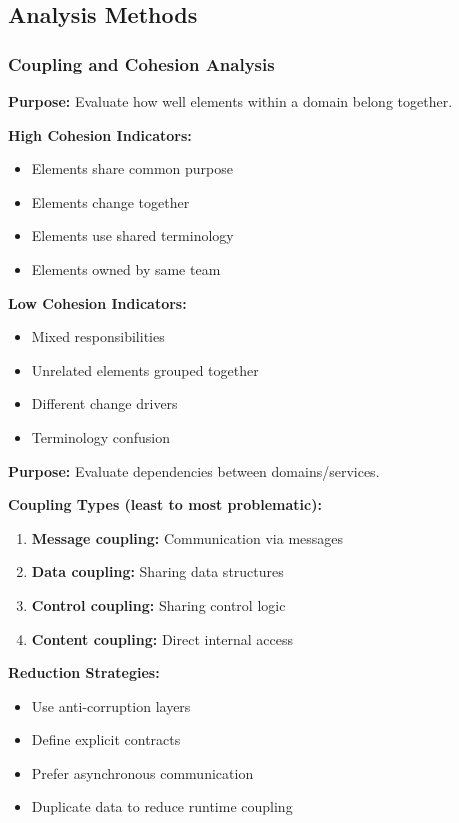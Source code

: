 \documentclass[11pt,letterpaper]{article}
\begin{document}
\subsection{Analysis Methods}

\subsubsection{Coupling and Cohesion Analysis}

\begin{definitionbox}
\textbf{Purpose:} Evaluate how well elements within a domain belong together.

\textbf{High Cohesion Indicators:}
\begin{itemize}[nosep]
    \item Elements share common purpose
    \item Elements change together
    \item Elements use shared terminology
    \item Elements owned by same team
\end{itemize}

\textbf{Low Cohesion Indicators:}
\begin{itemize}[nosep]
    \item Mixed responsibilities
    \item Unrelated elements grouped together
    \item Different change drivers
    \item Terminology confusion
\end{itemize}
\end{definitionbox}

\begin{definitionbox}
\textbf{Purpose:} Evaluate dependencies between domains/services.

\textbf{Coupling Types (least to most problematic):}
\begin{enumerate}[nosep]
    \item \textbf{Message coupling:} Communication via messages
    \item \textbf{Data coupling:} Sharing data structures
    \item \textbf{Control coupling:} Sharing control logic
    \item \textbf{Content coupling:} Direct internal access
\end{enumerate}

\textbf{Reduction Strategies:}
\begin{itemize}[nosep]
    \item Use anti-corruption layers
    \item Define explicit contracts
    \item Prefer asynchronous communication
    \item Duplicate data to reduce runtime coupling
\end{itemize}
\end{definitionbox}
\end{document}
